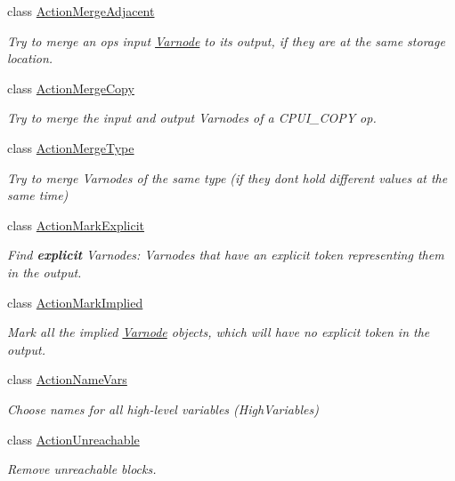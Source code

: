 \begin{DoxyCompactItemize}
class \mbox{\hyperlink{class_action_merge_adjacent}{Action\+Merge\+Adjacent}}
\begin{DoxyCompactList}\small\item\em Try to merge an op\textquotesingle{}s input \mbox{\hyperlink{class_varnode}{Varnode}} to its output, if they are at the same storage location. \end{DoxyCompactList}\item 
class \mbox{\hyperlink{class_action_merge_copy}{Action\+Merge\+Copy}}
\begin{DoxyCompactList}\small\item\em Try to merge the input and output Varnodes of a C\+P\+U\+I\+\_\+\+C\+O\+PY op. \end{DoxyCompactList}\item 
class \mbox{\hyperlink{class_action_merge_type}{Action\+Merge\+Type}}
\begin{DoxyCompactList}\small\item\em Try to merge Varnodes of the same type (if they don\textquotesingle{}t hold different values at the same time) \end{DoxyCompactList}\item 
class \mbox{\hyperlink{class_action_mark_explicit}{Action\+Mark\+Explicit}}
\begin{DoxyCompactList}\small\item\em Find {\bfseries{explicit}} Varnodes\+: Varnodes that have an explicit token representing them in the output. \end{DoxyCompactList}\item 
class \mbox{\hyperlink{class_action_mark_implied}{Action\+Mark\+Implied}}
\begin{DoxyCompactList}\small\item\em Mark all the {\itshape implied} \mbox{\hyperlink{class_varnode}{Varnode}} objects, which will have no explicit token in the output. \end{DoxyCompactList}\item 
class \mbox{\hyperlink{class_action_name_vars}{Action\+Name\+Vars}}
\begin{DoxyCompactList}\small\item\em Choose names for all high-\/level variables (High\+Variables) \end{DoxyCompactList}\item 
class \mbox{\hyperlink{class_action_unreachable}{Action\+Unreachable}}
\begin{DoxyCompactList}\small\item\em Remove unreachable blocks. \end{DoxyCompactList}\item 

\end{DoxyCompactItemize}
